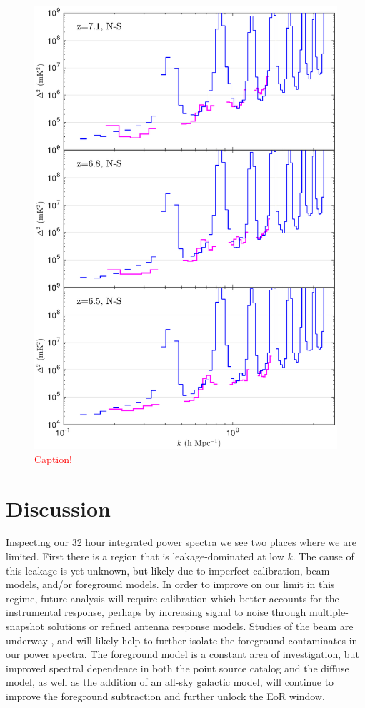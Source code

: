 \documentclass[iop]{emulateapj}
\begin{document}
\begin{figure}
\includegraphics[width=\columnwidth]{1D_spectra_comparison.pdf}
\caption{
\textcolor{red}{Caption!}
\label{fig:ps_comparison}
}
\end{figure}

\section{Discussion}\label{sec:discussion}
Inspecting our 32 hour integrated power spectra we see two places where we are limited. 
First there is a region that is leakage-dominated at low $k$. The cause of this leakage is yet 
unknown, but likely due to imperfect calibration, beam models, and/or foreground models. 
In order to improve on our limit in this regime, future analysis will require calibration which 
better accounts for the instrumental response, perhaps by increasing signal to noise 
through multiple-snapshot solutions or refined antenna response models. Studies of the 
beam are underway \citep[e.g.][]{Neben:2015}, and will likely help to further isolate the 
foreground contaminates in our power spectra. The foreground model is a constant area of 
investigation, but improved spectral dependence in both the point source catalog and the 
diffuse model, as well as the addition of an all-sky galactic model, will continue to improve 
the foreground subtraction and further unlock the EoR window.
\end{document}
